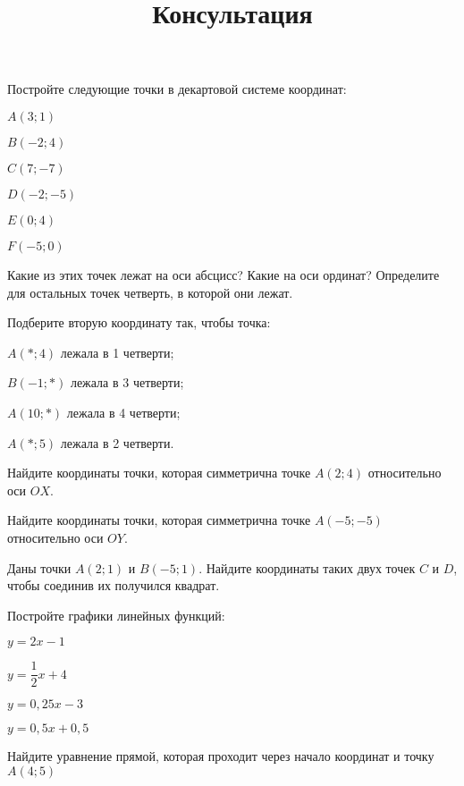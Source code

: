%
%
\newpage
\title{Консультация}
\begin{listofex}
	\item Постройте следующие точки в декартовой системе координат:
	\begin{enumcols}[itemcolumns=3]
		\item \( A(3;1) \)
		\item \( B(-2;4) \)
		\item \( C(7;-7) \)
		\item \( D(-2;-5) \)
		\item \( E(0;4) \)
		\item \( F(-5;0) \)
	\end{enumcols}
	Какие из этих точек лежат на оси абсцисс? Какие на оси ординат? Определите для остальных точек четверть, в которой они лежат.
	\item Подберите вторую координату так, чтобы точка:
	\begin{enumcols}[itemcolumns=1]
		\item \( A(*;4) \) лежала в 1 четверти;
		\item \( B(-1;*) \) лежала в 3 четверти;
		\item \( A(10;*) \) лежала в 4 четверти;
		\item \( A(*;5) \) лежала в 2 четверти.
	\end{enumcols}
	\item Найдите координаты точки, которая симметрична точке \( A(2;4) \) относительно оси \( OX \).
	\item Найдите координаты точки, которая симметрична точке \( A(-5;-5) \) относительно оси \( OY \).
	\item Даны точки \( A(2;1) \) и \( B(-5;1) \). Найдите координаты таких двух точек \( C \) и \( D \), чтобы соединив их получился квадрат.
	\item Постройте графики линейных функций:
	\begin{enumcols}[itemcolumns=2]
		\item \( y=2x-1 \)
		\item \( y=\dfrac{1}{2}x+4 \)
		\item \( y=0,25x-3 \)
		\item \( y=0,5x+0,5 \)
	\end{enumcols}
	\item Найдите уравнение прямой, которая проходит через начало координат и точку \( A(4;5) \)
\end{listofex}
